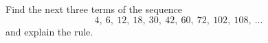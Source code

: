 Find the next three terms of the sequence
\[4,\ 6,\ 12,\ 18,\ 30,\ 42,\ 60,\ 72,\ 102,\ 108,\ \dots\]
and explain the rule.
